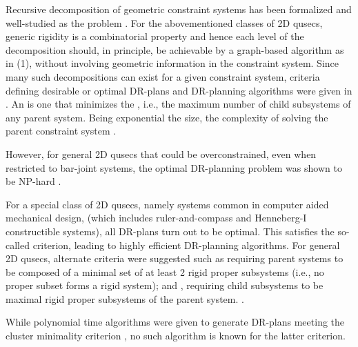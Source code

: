 \medskip\noindent
{}
Recursive decomposition of geometric constraint systems has been formalized \cite{hoffman2001decompositionI,hoffman2001decompositionII} and well-studied \cite{jermann2006decomposition,sitharam2005combinatorial} as the  problem \seedefsprelim. For the abovementioned classes of 2D qusecs, generic rigidity is a combinatorial property and hence each level of the decomposition should, in principle, be achievable by a graph-based algorithm as in (1), without involving geometric information in the constraint system. Since many such decompositions can exist for a given constraint system, criteria defining desirable or optimal DR-plans and DR-planning algorithms were given in \cite{hoffman2001decompositionI}. An  is one that minimizes the  \seedefsprelim, i.e., the maximum number of child subsystems of any parent system. Being exponential  the size, the complexity of solving the parent constraint system  .

However, for general 2D qusecs that could be overconstrained, even when restricted to bar-joint systems, the optimal DR-planning problem was shown to be NP-hard \cite{lomonosov2004graph}.

\medskip\noindent
{}
For a special class of 2D qusecs, namely  systems  \cite{fudos1997graph,owen1991algebraic,joan-arinyo2004revisiting}  common in computer aided mechanical design, (which includes ruler-and-compass and Henneberg-I constructible systems), all DR-plans turn out to be optimal. This satisfies the so-called  criterion, leading to highly efficient DR-planning algorithms. For general 2D qusecs, alternate criteria were suggested such as  requiring parent systems to be composed of a minimal set of at least 2 rigid proper subsystems (i.e., no proper subset forms a rigid system); and , requiring child subsystems to be maximal rigid proper subsystems of the parent system. \seedefsc.

While polynomial time algorithms were given to generate DR-plans meeting the cluster minimality criterion \cite{hoffman2001decompositionI}, no such algorithm is known for the latter criterion.


